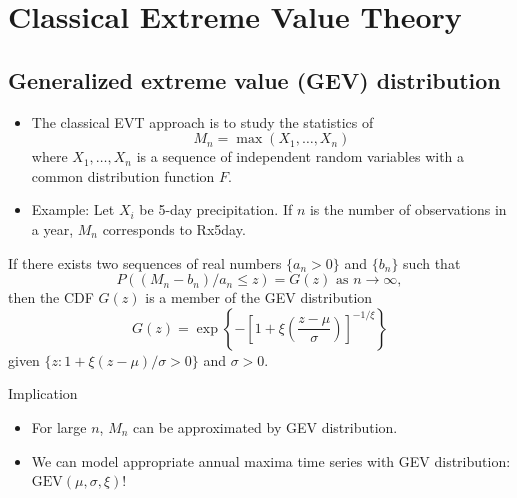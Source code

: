 \documentclass[
11pt,notheorems,hyperref={pdfauthor=whatever}
]{beamer}
\begin{document}
\section{Classical Extreme Value Theory}

\subsection{Generalized extreme value (GEV) distribution}
\begin{frame}
    \begin{itemize}
        \item The classical EVT approach is to study the statistics of 
        \[M_n = \max (X_1, \ldots, X_n)\]
        where $X_1, \ldots, X_n$ is a sequence of independent random variables with a common distribution function $F$.
        \item Example: Let $X_i$ be 5-day precipitation. If $n$ is the number of observations in a year, $M_n$ corresponds to Rx5day. 
    \end{itemize}
\end{frame}

\begin{frame}
    \begin{theorem}
        If there exists two sequences of real numbers $\{a_n > 0\}$ and $\{b_n\}$ such that 
        \[
        P((M_n - b_n)/a_n \leq z) = G(z) \text{ as } n \rightarrow \infty,
        \]
        then the CDF $G(z)$ is a member of the GEV distribution
        \[
        G(z) = \exp{ \left\{ -\left[ 1 + \xi \left( \frac{z-\mu}{\sigma} \right) \right]^{-1/\xi} \right\} }
        \]
        given $\{z : 1 + \xi(z-\mu)/\sigma > 0 \}$ and $\sigma>0$.
    \end{theorem} \pause

    \begin{alertblock}{Implication}
        \begin{itemize}
            \item For large $n$, $M_n$ can be approximated by GEV distribution. 
            \item We can model appropriate annual maxima time series with GEV distribution: $\text{GEV}(\mu, \sigma, \xi)$!
        \end{itemize}
    \end{alertblock}
\end{frame}
\end{document}
